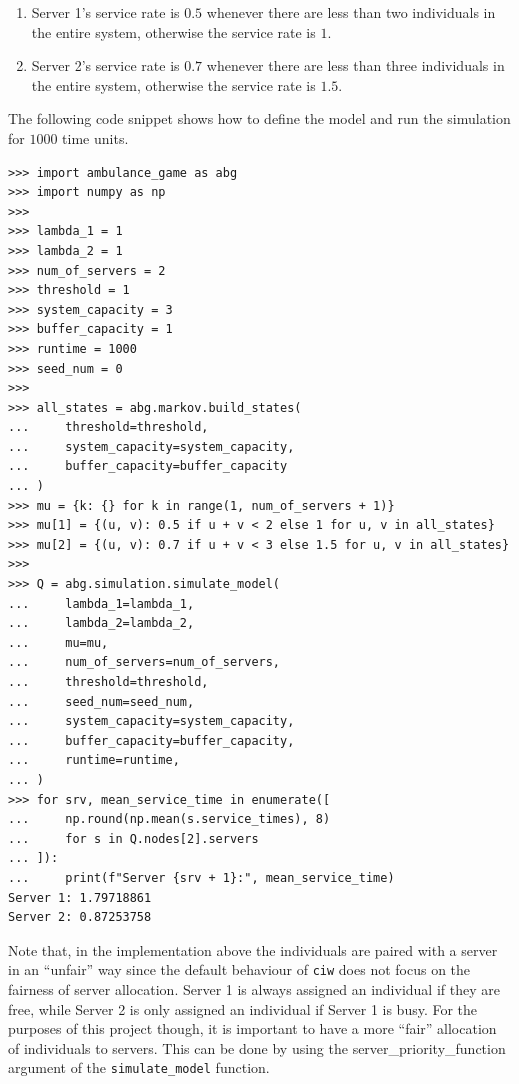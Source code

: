 \begin{enumerate}
    \item Server 1's service rate is \(0.5\) whenever there are less than two
    individuals in the entire system, otherwise the service rate is \(1\).
    \item Server 2's service rate is \(0.7\) whenever there are less than three
    individuals in the entire system, otherwise the service rate is \(1.5\).
\end{enumerate}

The following code snippet shows how to define the model and run the simulation
for \(1000\) time units.

\begin{lstlisting}[style=pystyle]
>>> import ambulance_game as abg
>>> import numpy as np
>>>
>>> lambda_1 = 1
>>> lambda_2 = 1
>>> num_of_servers = 2
>>> threshold = 1
>>> system_capacity = 3
>>> buffer_capacity = 1
>>> runtime = 1000
>>> seed_num = 0
>>> 
>>> all_states = abg.markov.build_states(
...     threshold=threshold,
...     system_capacity=system_capacity,
...     buffer_capacity=buffer_capacity
... )
>>> mu = {k: {} for k in range(1, num_of_servers + 1)}
>>> mu[1] = {(u, v): 0.5 if u + v < 2 else 1 for u, v in all_states}
>>> mu[2] = {(u, v): 0.7 if u + v < 3 else 1.5 for u, v in all_states}
>>>
>>> Q = abg.simulation.simulate_model(
...     lambda_1=lambda_1,
...     lambda_2=lambda_2,
...     mu=mu,
...     num_of_servers=num_of_servers,
...     threshold=threshold,
...     seed_num=seed_num,
...     system_capacity=system_capacity,
...     buffer_capacity=buffer_capacity,
...     runtime=runtime,
... )
>>> for srv, mean_service_time in enumerate([
...     np.round(np.mean(s.service_times), 8)
...     for s in Q.nodes[2].servers
... ]):
...     print(f"Server {srv + 1}:", mean_service_time)
Server 1: 1.79718861
Server 2: 0.87253758

\end{lstlisting}

Note that, in the implementation above the individuals are paired with a server
in an ``unfair'' way since the default behaviour of \texttt{ciw} does not
focus on the fairness of server allocation.
Server 1 is always assigned an individual if they are free, while Server 2 is
only assigned an individual if Server 1 is busy.
For the purposes of this project though, it is important to have a more
``fair'' allocation of individuals to servers.
This can be done by using the server\_priority\_function argument of the
\texttt{simulate\_model} function.

